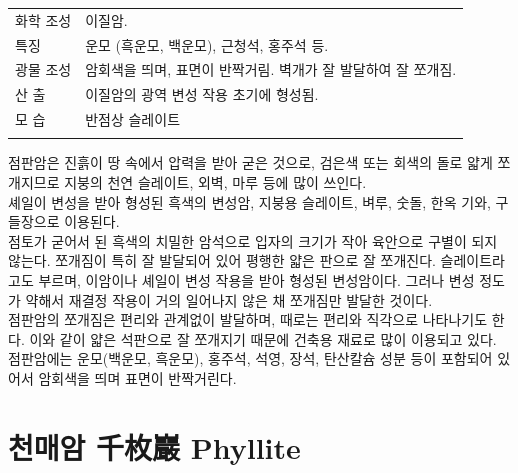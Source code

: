 \documentclass[12pt, a4paper, twoside]{book}
\begin{document}
				\begin{tabu} to 1.0\textwidth { X[l, 1.0] X[l, 3.0] }
				\tabucline[0.2ex]{-}		
				화학  조성		&이질암.\\
				특징				&운모 (흑운모, 백운모), 근청석, 홍주석 등.\\
				광물  조성		&암회색을 띄며, 표면이 반짝거림. 벽개가 잘 발달하여 잘 쪼개짐.\\
				산      출		&이질암의 광역 변성 작용 초기에 형성됨.	\\
				모      습		&반점상 슬레이트\\
				\tabucline[0.1ex]{-}		
				\end{tabu} 

		\clearpage 
		
			점판암은 진흙이 땅 속에서 압력을 받아 굳은 것으로, 검은색 또는 회색의 돌로 얇게 쪼개지므로 지붕의 천연 슬레이트, 외벽, 마루 등에 많이 쓰인다.	\\
			
			셰일이 변성을 받아 형성된 흑색의 변성암, 지붕용 슬레이트, 벼루, 숫돌, 한옥 기와, 구들장으로 이용된다. \\

 
			점토가 굳어서 된 흑색의 치밀한 암석으로 입자의 크기가 작아 육안으로 구별이 되지 않는다. 
			쪼개짐이 특히 잘 발달되어 있어 평행한 얇은 판으로 잘 쪼개진다. 슬레이트라고도 부르며, 이암이나 셰일이 변성 작용을 받아 형성된 변성암이다. 
			그러나 변성 정도가 약해서 재결정 작용이 거의 일어나지 않은 채 쪼개짐만 발달한 것이다. \\

			점판암의 쪼개짐은 편리와 관계없이 발달하며, 때로는 편리와 직각으로 나타나기도 한다. 
			이와 같이 얇은 석판으로 잘 쪼개지기 때문에 건축용 재료로 많이 이용되고 있다. 
			점판암에는 운모(백운모, 흑운모), 홍주석, 석영, 장석, 탄산칼슘 성분 등이 포함되어 있어서 암회색을 띄며 표면이 반짝거린다. 	\\

			









	\clearpage
	\section{천매암 千枚巖 Phyllite   }
	
\end{document}
